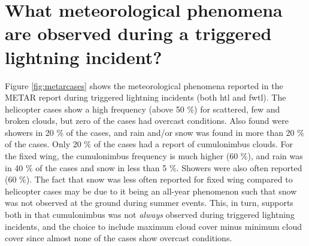 \section{What meteorological phenomena are observed during a triggered lightning incident?}

Figure \ref{fig:metarcases} shows the meteorological phenomena reported in the METAR report during triggered lightning incidents (both \acrshort{htl} and \acrshort{fwtl}). The helicopter cases show a high frequency (above 50 $\%$) for scattered, few and broken clouds, but zero of the cases had overcast conditions. Also found were showers in 20 $\%$ of the cases, and rain and/or snow was found in more than 20 $\%$ of the cases. Only 20 $\%$ of the cases had a report of cumulonimbus clouds. For the fixed wing, the cumulonimbus frequency is much higher (60 $\%$), and rain was in 40 $\%$ of the cases and snow in less than 5 $\%$. Showers were also often reported (60 $\%$). The fact that snow was less often reported for fixed wing compared to helicopter cases may be due to it being an all-year phenomenon such that snow was not observed at the ground during summer events. This, in turn, supports both \cite{lande1999} in that cumulonimbus was not \textit{always} observed during triggered lightning incidents, and the choice to include maximum cloud cover minus minimum cloud cover since almost none of the cases show overcast conditions.

